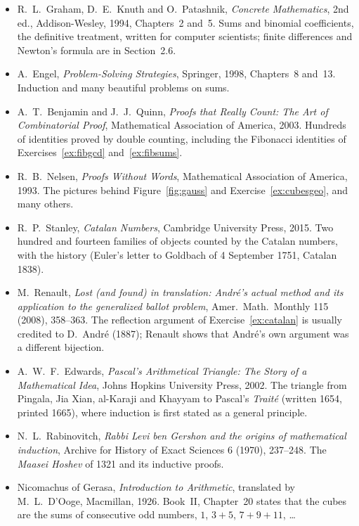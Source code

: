 \begin{itemize}\raggedright
\item R.~L.~Graham, D.~E.~Knuth and O.~Patashnik, \emph{Concrete Mathematics}, 2nd ed., Addison-Wesley, 1994, Chapters~2 and~5. Sums and binomial coefficients, the definitive treatment, written for computer scientists; finite differences and Newton's formula are in Section~2.6.
\item A.~Engel, \emph{Problem-Solving Strategies}, Springer, 1998, Chapters~8 and~13. Induction and many beautiful problems on sums.
\item A.~T.~Benjamin and J.~J.~Quinn, \emph{Proofs that Really Count: The Art of Combinatorial Proof}, Mathematical Association of America, 2003. Hundreds of identities proved by double counting, including the Fibonacci identities of Exercises~\ref{ex:fibgcd} and~\ref{ex:fibsums}.
\item R.~B.~Nelsen, \emph{Proofs Without Words}, Mathematical Association of America, 1993. The pictures behind Figure~\ref{fig:gauss} and Exercise~\ref{ex:cubesgeo}, and many others.
\item R.~P.~Stanley, \emph{Catalan Numbers}, Cambridge University Press, 2015. Two hundred and fourteen families of objects counted by the Catalan numbers, with the history (Euler's letter to Goldbach of 4 September 1751, Catalan 1838).
\item M.~Renault, \emph{Lost (and found) in translation: Andr\'e's actual method and its application to the generalized ballot problem}, Amer.\ Math.\ Monthly 115 (2008), 358--363. The reflection argument of Exercise~\ref{ex:catalan} is usually credited to D.~Andr\'e (1887); Renault shows that Andr\'e's own argument was a different bijection.
\item A.~W.~F.~Edwards, \emph{Pascal's Arithmetical Triangle: The Story of a Mathematical Idea}, Johns Hopkins University Press, 2002. The triangle from Pingala, Jia Xian, al-Karaji and Khayyam to Pascal's \emph{Trait\'e} (written 1654, printed 1665), where induction is first stated as a general principle.
\item N.~L.~Rabinovitch, \emph{Rabbi Levi ben Gershon and the origins of mathematical induction}, Archive for History of Exact Sciences 6 (1970), 237--248. The \emph{Maasei Hoshev} of 1321 and its inductive proofs.
\item Nicomachus of Gerasa, \emph{Introduction to Arithmetic}, translated by M.~L.~D'Ooge, Macmillan, 1926. Book~II, Chapter~20 states that the cubes are the sums of consecutive odd numbers, $1$, $3+5$, $7+9+11$, \dots

\end{itemize}
